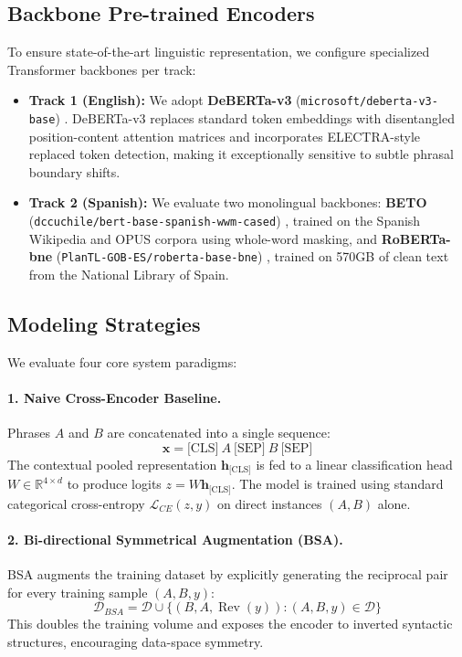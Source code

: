 \documentclass[11pt,a4paper,twocolumn]{article}
\begin{document}
\subsection{Backbone Pre-trained Encoders}
To ensure state-of-the-art linguistic representation, we configure specialized Transformer backbones per track:
\begin{itemize}
    \item \textbf{Track 1 (English):} We adopt \textbf{DeBERTa-v3} (\nolinkurl{microsoft/deberta-v3-base}) \citep{he2021debertav3}. DeBERTa-v3 replaces standard token embeddings with disentangled position-content attention matrices and incorporates ELECTRA-style replaced token detection, making it exceptionally sensitive to subtle phrasal boundary shifts.
    \item \textbf{Track 2 (Spanish):} We evaluate two monolingual backbones: \textbf{BETO} (\nolinkurl{dccuchile/bert-base-spanish-wwm-cased}) \citep{canete2020beto}, trained on the Spanish Wikipedia and OPUS corpora using whole-word masking, and \textbf{RoBERTa-bne} (\nolinkurl{PlanTL-GOB-ES/roberta-base-bne}) \citep{gutierrezfandino2022mariah}, trained on 570GB of clean text from the National Library of Spain.
\end{itemize}

\subsection{Modeling Strategies}
We evaluate four core system paradigms:

\paragraph{1. Naive Cross-Encoder Baseline.}
Phrases $A$ and $B$ are concatenated into a single sequence:
\begin{equation}
\mathbf{x} = \text{[CLS]} \ A \ \text{[SEP]} \ B \ \text{[SEP]}
\end{equation}
The contextual pooled representation $\mathbf{h}_{\text{[CLS]}}$ is fed to a linear classification head $W \in \mathbb{R}^{4 \times d}$ to produce logits $z = W \mathbf{h}_{\text{[CLS]}}$. The model is trained using standard categorical cross-entropy $\mathcal{L}_{CE}(z, y)$ on direct instances $(A, B)$ alone.

\paragraph{2. Bi-directional Symmetrical Augmentation (BSA).}
BSA augments the training dataset by explicitly generating the reciprocal pair for every training sample $(A, B, y)$:
\begin{equation}
\mathcal{D}_{BSA} = \mathcal{D} \cup \{(B, A, \operatorname{Rev}(y)) : (A, B, y) \in \mathcal{D}\}
\end{equation}
This doubles the training volume and exposes the encoder to inverted syntactic structures, encouraging data-space symmetry.
\end{document}
